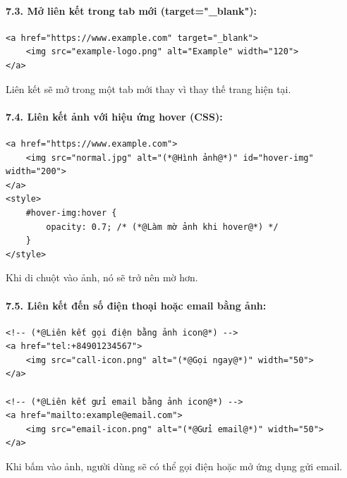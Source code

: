 \documentclass[11pt,oneside]{book}
\begin{document}
\paragraph{7.3. Mở liên kết trong tab mới (target="\_blank"):}
\begin{codeWindow}
\begin{lstlisting}[language=HTML5]
<a href="https://www.example.com" target="_blank">
    <img src="example-logo.png" alt="Example" width="120">
</a>
\end{lstlisting}
\end{codeWindow}

Liên kết sẽ mở trong một tab mới thay vì thay thế trang hiện tại.

\paragraph{7.4. Liên kết ảnh với hiệu ứng hover (CSS):}
\begin{codeWindow}
\begin{lstlisting}[language=HTML5]
<a href="https://www.example.com">
    <img src="normal.jpg" alt="(*@Hình ảnh@*)" id="hover-img" width="200">
</a>
<style>
    #hover-img:hover {
        opacity: 0.7; /* (*@Làm mờ ảnh khi hover@*) */
    }
</style>
\end{lstlisting}
\end{codeWindow}

Khi di chuột vào ảnh, nó sẽ trở nên mờ hơn.

\paragraph{7.5. Liên kết đến số điện thoại hoặc email bằng ảnh:}
\begin{codeWindow}
\begin{lstlisting}[language=HTML5]
<!-- (*@Liên kết gọi điện bằng ảnh icon@*) -->
<a href="tel:+84901234567">
    <img src="call-icon.png" alt="(*@Gọi ngay@*)" width="50">
</a>

<!-- (*@Liên kết gửi email bằng ảnh icon@*) -->
<a href="mailto:example@email.com">
    <img src="email-icon.png" alt="(*@Gửi email@*)" width="50">
</a>
\end{lstlisting}
\end{codeWindow}

Khi bấm vào ảnh, người dùng sẽ có thể gọi điện hoặc mở ứng dụng gửi email.
\end{document}
